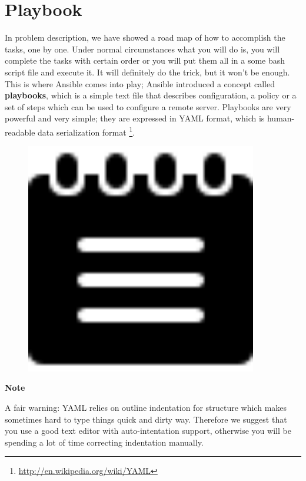 \documentclass[10pt]{book}
\begin{document}
\section{Playbook}
In problem description, we have showed a road map of how to accomplish the tasks, one by one.
Under normal circumstances what you will do is, you will complete the tasks with 
certain order or you will put them all in a some bash script file and execute 
it. It will definitely do the trick, but it won't be enough. This is where Ansible 
comes into play; Ansible introduced a concept called {\bf playbooks}, which is a simple text file that 
describes configuration, a policy or a set of steps which can be used to 
configure a remote server. Playbooks are very powerful and very 
simple; they are expressed in YAML format, which is human-readable data serialization 
format \footnote { \url{http://en.wikipedia.org/wiki/YAML}}. 

\begin{mdframed}[style=noteStyle]
\begin{minipage}[b]{0.05\textwidth}
\begin{figure}[H]
\includegraphics[width=0.9\textwidth]{figures/notes-icon.png} 
\end{figure}
\end{minipage}  
\begin{minipage}[b]{0.05\textwidth}
\textbf{Note}
\end{minipage}

A fair warning:  YAML relies on outline indentation 
for structure which makes sometimes hard to type things quick and dirty way. 
Therefore we suggest that you use a good text editor with auto-intentation support, otherwise you will
be spending a lot of time correcting indentation manually.
\end{mdframed}
\end{document}
